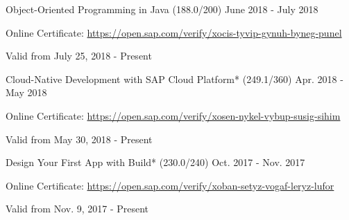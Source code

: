 \begin{cventries}
  \cventry
    {Object-Oriented Programming in Java (188.0/200)} %
    {} %
    {} %
    {June 2018 - July 2018} %
    {
	    \begin{cvitems} %
        \item[] {Online Certificate: \url{https://open.sap.com/verify/xocis-tyvip-gynuh-byneg-punel}} %
        \item[] {Valid from July 25, 2018 - Present} %
      \end{cvitems}
    }   
    \vspace{-0.1cm}
  \cventry
    {Cloud-Native Development with SAP Cloud Platform* (249.1/360)} %
    {} %
    {} %
    {Apr. 2018 - May 2018} %
    {
	    \begin{cvitems} %
        \item[] {Online Certificate: \url{https://open.sap.com/verify/xosen-nykel-vybup-susig-sihim}} %
        \item[] {Valid from May 30, 2018 - Present} %
      \end{cvitems}
    }   
    \vspace{-0.1cm}
  \cventry
    {Design Your First App with Build* (230.0/240)} %
    {} %
    {} %
    {Oct. 2017 - Nov. 2017} %
    {
	    \begin{cvitems} %
        \item[] {Online Certificate: \url{https://open.sap.com/verify/xoban-setyz-vogaf-leryz-lufor}} %
        \item[] {Valid from Nov. 9, 2017 - Present} %
      \end{cvitems}
    }      
    \vspace{-0.1cm}

\end{cventries}
